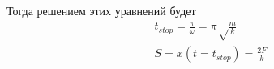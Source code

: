 \documentclass[a5paper,10pt]{article}
\begin{document}
Тогда решением этих уравнений будет
\begin{gather*}
    t_{stop}=\frac{\pi}{\omega}=\pi\sqrt\frac{m}{k}\\
    S=x(t=t_{stop})=\frac{2F}{k}
\end{gather*}

\end{document}
